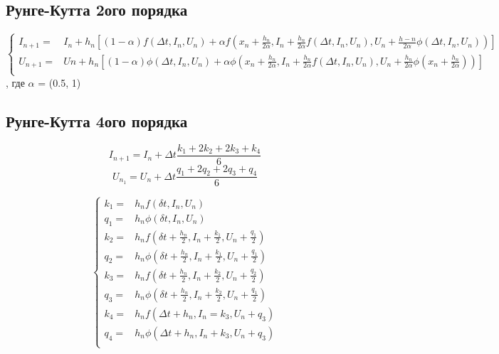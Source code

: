 \documentclass[12pt,a4paper]{scrartcl}
\begin{document}
\subsection {Рунге-Кутта 2ого порядка}
	\begin{equation*}
		\begin{cases}
			I_{n + 1} = & I_n + h_n[(1 - \alpha)f(\Delta t, I_n, U_n) + \alpha f(x_n + \frac{h_n}{2\alpha}, I_n + \frac{h_n}{2\alpha}f(\Delta t, I_n, U_n), U_n + \frac{h-n}{2\alpha}\phi(\Delta t, I_n, U_n))] \\
			U_{n + 1} = &  Un + h_n[(1 - \alpha)\phi(\Delta t, I_n, U_n) + \alpha\phi(x_n + \frac{h_n}{2\alpha}, I_n + \frac{h_n}{2\alpha}f(\Delta t, I_n, U_n), U_n + \frac{h_n}{2\alpha}\phi(x_n + \frac{h_n}{2\alpha}))] \\
		\end{cases}
	\end{equation*}, где $\alpha$ = (0.5, 1)
	
\subsection{Рунге-Кутта 4ого порядка}
	\begin{equation*}
		I_{n + 1} = I_n + \Delta t\frac{k_1+2k_2+2k_3+k_4}{6}
	\end{equation*}
	\begin{equation*}
		U_{n_1} = U_n + \Delta t \frac{q_1 + 2q_2 + 2q_3 + q_4}{6}
	\end{equation*}
	
	\begin{equation*}
		\begin{cases}
			k_1= & h_nf(\delta t, I_n, U_n) \\
			q_1= & h_n\phi(\delta t, I_n, U_n) \\
			k_2= & h_nf(\delta t + \frac{h_n}{2}, I_n + \frac{k_1}{2}, U_n + \frac{q_1}{2}) \\
			q_2= & h_n\phi(\delta t + \frac{h_n}{2}, I_n + \frac{k_1}{2}, U_n + \frac{q_1}{2}) \\
			k_3= & h_nf(\delta t + \frac{h_n}{2}, I_n + \frac{k_2}{2}, U_n + \frac{q_2}{2}) \\
			q_3= & h_n\phi(\delta t + \frac{h_n}{2}, I_n + \frac{k_2}{2}, U_n + \frac{q_1}{2}) \\
			k_4= & h_nf(\Delta t + h_n, I_n = k_3, U_n + q_3) \\ 
			q_4= & h_n\phi(\Delta t + h_n, I_n + k_3, U_n + q_3 ) \\
		\end{cases}
	\end{equation*}
	
\end{document}

